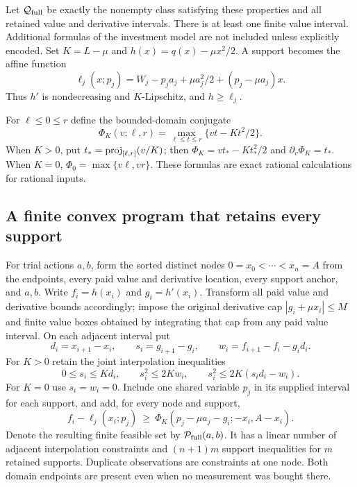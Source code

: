 Let $\mathcal Q_{\rm full}$ be exactly the nonempty class satisfying
these properties and all retained value and derivative intervals.
There is at least one finite value interval. Additional formulas of the
investment model are not included unless explicitly encoded. Set
$K=L-\mu$ and $h(x)=q(x)-\mu x^2/2$. A support becomes the affine
function
\begin{equation}\label{eq:affinesupport125}
 \ell_j(x;p_j)=W_j-p_ja_j+\mu a_j^2/2+(p_j-\mu a_j)x.
\end{equation}
Thus $h'$ is nondecreasing and $K$-Lipschitz, and $h\ge\ell_j$.

For $\ell\le0\le r$ define the bounded-domain conjugate
\begin{equation}\label{eq:boundedconjugate125}
 \Phi_K(v;\ell,r)=\max_{\ell\le t\le r}
              \{vt-Kt^2/2\}.
\end{equation}
When $K>0$, put $t_*={\rm proj}_{[\ell,r]}(v/K)$; then
$\Phi_K=vt_*-Kt_*^2/2$ and $\partial_v\Phi_K=t_*$.
When $K=0$, $\Phi_0=\max\{v\ell,vr\}$.
These formulas are exact rational calculations for rational inputs.

\subsection{A finite convex program that retains every support}

For trial actions $a,b$, form the sorted distinct nodes
$0=x_0<\cdots<x_n=A$ from the endpoints, every paid value and
derivative location, every support anchor, and $a,b$.
Write $f_i=h(x_i)$ and $g_i=h'(x_i)$. Transform all paid
value and derivative bounds accordingly; impose the original derivative
cap $|g_i+\mu x_i|\le M$ and finite value boxes obtained by integrating
that cap from any paid value interval. On each adjacent interval put
\[
 d_i=x_{i+1}-x_i,\qquad s_i=g_{i+1}-g_i,\qquad
 w_i=f_{i+1}-f_i-g_id_i.
\]
For $K>0$ retain the joint interpolation inequalities
\begin{equation}\label{eq:adjacentfull125}
 0\le s_i\le Kd_i,\qquad
 s_i^2\le2Kw_i,\qquad s_i^2\le2K(s_id_i-w_i).
\end{equation}
For $K=0$ use $s_i=w_i=0$. Include one shared variable $p_j$ in
its supplied interval for each support, and add, for every node and support,
\begin{equation}\label{eq:obstaclefull125}
 f_i-\ell_j(x_i;p_j)\ \ge\
 \Phi_K(p_j-\mu a_j-g_i;-x_i,A-x_i).
\end{equation}
Denote the resulting finite feasible set by $\mathcal P_{\rm full}(a,b)$.
It has a linear number of adjacent interpolation constraints and
$(n+1)m$ support inequalities for $m$ retained supports. Duplicate
observations are constraints at one node. Both domain endpoints are
present even when no measurement was bought there.


